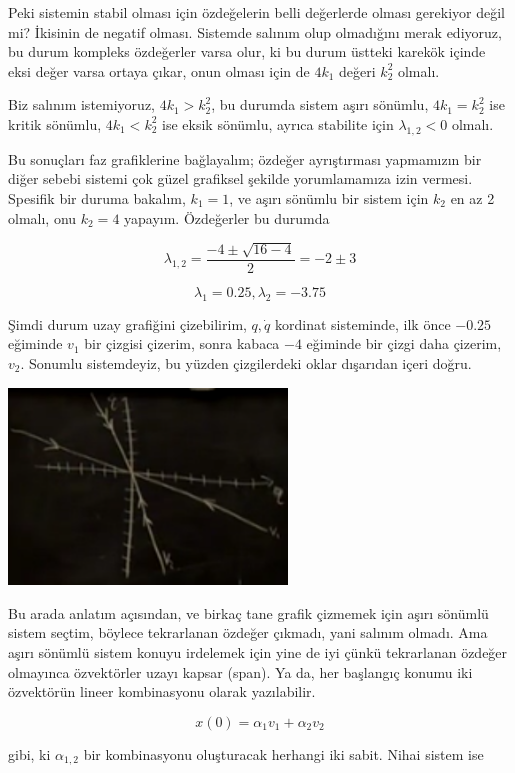 \documentclass[12pt,fleqn]{article}\usepackage{../../common}
\begin{document}
Peki sistemin stabil olması için özdeğelerin belli değerlerde olması
gerekiyor değil mi? İkisinin de negatif olması. Sistemde salınım olup
olmadığını merak ediyoruz, bu durum kompleks özdeğerler varsa olur, ki bu
durum üstteki karekök içinde eksi değer varsa ortaya çıkar, onun olması
için de $4 k_1$ değeri $k_2^2$ olmalı. 

Biz salınım istemiyoruz, $4 k_1 > k_2^2$, bu durumda sistem aşırı sönümlu,
$4 k_1 = k_2^2$ ise kritik sönümlu, $4 k_1 < k_2^2$ ise eksik sönümlu,
ayrıca stabilite için $\lambda_{1,2} < 0$ olmalı.

Bu sonuçları faz grafiklerine bağlayalım; özdeğer ayrıştırması yapmamızın
bir diğer sebebi sistemi çok güzel grafiksel şekilde yorumlamamıza izin
vermesi. Spesifik bir duruma bakalım, $k_1 = 1$, ve aşırı sönümlu bir
sistem için $k_2$ en az 2 olmalı, onu $k_2 = 4$ yapayım. Özdeğerler bu
durumda  

$$
\lambda_{1,2} =  \frac{-4 \pm \sqrt{16-4}}{2} =
-2 \pm 3 
$$

$$
\lambda_1 = 0.25, \lambda_2 = -3.75
$$
 
Şimdi durum uzay grafiğini çizebilirim, $q,\dot{q}$ kordinat sisteminde,
ilk önce $-0.25$ eğiminde $v_1$ bir çizgisi çizerim,  sonra kabaca $-4$
eğiminde bir çizgi daha çizerim, $v_2$. Sonumlu sistemdeyiz, bu yüzden
çizgilerdeki oklar dışarıdan içeri doğru. 

\includegraphics[width=20em]{phy_control_02.png}

Bu arada anlatım açısından, ve birkaç tane grafik çizmemek için aşırı
sönümlü sistem seçtim, böylece tekrarlanan özdeğer çıkmadı, yani salınım
olmadı. Ama aşırı sönümlü sistem konuyu irdelemek için yine de iyi çünkü
tekrarlanan özdeğer olmayınca özvektörler uzayı kapsar (span). Ya da, her
başlangıç konumu iki özvektörün lineer kombinasyonu olarak yazılabilir.

$$
x(0) = \alpha_1 v_1 + \alpha_2 v_2
$$

gibi, ki $\alpha_{1,2}$ bir kombinasyonu oluşturacak herhangi iki
sabit. Nihai sistem ise 
\end{document}
